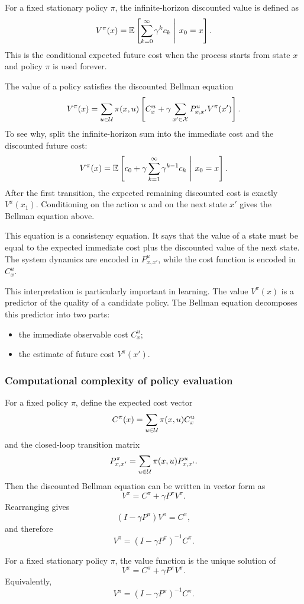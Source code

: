For a fixed stationary policy \(\pi\), the infinite-horizon discounted value is defined as
\[
V^\pi(x)
=
\mathbb{E}\left[
\sum_{k=0}^{\infty}\gamma^k c_k
\ \middle|\ x_0=x
\right].
\]
This is the conditional expected future cost when the process starts from state \(x\) and policy
\(\pi\) is used forever.

The value of a policy satisfies the discounted Bellman equation
\[
V^\pi(x)
=
\sum_{u\in\mathcal{U}}\pi(x,u)
\left[
C_x^u
+
\gamma
\sum_{x'\in\mathcal{X}}P^u_{x,x'}V^\pi(x')
\right].
\]
To see why, split the infinite-horizon sum into the immediate cost and the discounted future
cost:
\[
V^\pi(x)
=
\mathbb{E}\left[
c_0+\gamma\sum_{k=1}^{\infty}\gamma^{k-1}c_k
\ \middle|\ x_0=x
\right].
\]
After the first transition, the expected remaining discounted cost is exactly \(V^\pi(x_1)\).
Conditioning on the action \(u\) and on the next state \(x'\) gives the Bellman equation above.

This equation is a consistency equation. It says that the value of a state must be equal to the
expected immediate cost plus the discounted value of the next state. The system dynamics are
encoded in \(P^u_{x,x'}\), while the cost function is encoded in \(C_x^u\).

This interpretation is particularly important in learning. The value \(V^\pi(x)\) is a predictor
of the quality of a candidate policy. The Bellman equation decomposes this predictor into two
parts:
\begin{itemize}
    \item the immediate observable cost \(C_x^u\);
    \item the estimate of future cost \(V^\pi(x')\).
\end{itemize}

\subsubsection{Computational complexity of policy evaluation}

For a fixed policy \(\pi\), define the expected cost vector
\[
C^\pi(x)
=
\sum_{u\in\mathcal{U}}\pi(x,u)C_x^u
\]
and the closed-loop transition matrix
\[
P^\pi_{x,x'}
=
\sum_{u\in\mathcal{U}}\pi(x,u)P^u_{x,x'}.
\]
Then the discounted Bellman equation can be written in vector form as
\[
V^\pi
=
C^\pi+\gamma P^\pi V^\pi.
\]
Rearranging gives
\[
(I-\gamma P^\pi)V^\pi
=
C^\pi,
\]
and therefore
\[
V^\pi
=
(I-\gamma P^\pi)^{-1}C^\pi.
\]

\begin{theorembox}
For a fixed stationary policy \(\pi\), the value function is the unique solution of
\[
V^\pi
=
C^\pi+\gamma P^\pi V^\pi.
\]
Equivalently,
\[
V^\pi
=
(I-\gamma P^\pi)^{-1}C^\pi.
\]
\end{theorembox}

